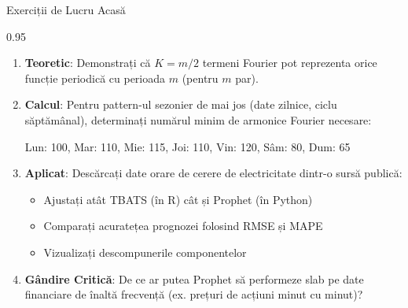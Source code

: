 \documentclass[9pt, aspectratio=169, t]{beamer}
\begin{document}
\begin{frame}{Exerciții de Lucru Acasă}
    \begin{cminipage}{0.95\textwidth}
    {\footnotesize
    \begin{enumerate}\setlength{\itemsep}{2pt}
        \item \textbf{Teoretic}: Demonstrați că $K = m/2$ termeni Fourier pot reprezenta orice funcție periodică cu perioada $m$ (pentru $m$ par).

        \item \textbf{Calcul}: Pentru pattern-ul sezonier de mai jos (date zilnice, ciclu săptămânal), determinați numărul minim de armonice Fourier necesare:
            \begin{center}
            Lun: 100, Mar: 110, Mie: 115, Joi: 110, Vin: 120, Sâm: 80, Dum: 65
            \end{center}

        \item \textbf{Aplicat}: Descărcați date orare de cerere de electricitate dintr-o sursă publică:
            \begin{itemize}\setlength{\itemsep}{0pt}
                \item Ajustați atât TBATS (în R) cât și Prophet (în Python)
                \item Comparați acuratețea prognozei folosind RMSE și MAPE
                \item Vizualizați descompunerile componentelor
            \end{itemize}

        \item \textbf{Gândire Critică}: De ce ar putea Prophet să performeze slab pe date financiare de înaltă frecvență (ex. prețuri de acțiuni minut cu minut)?
    \end{enumerate}
    }
    \end{cminipage}
\end{frame}
\end{document}

